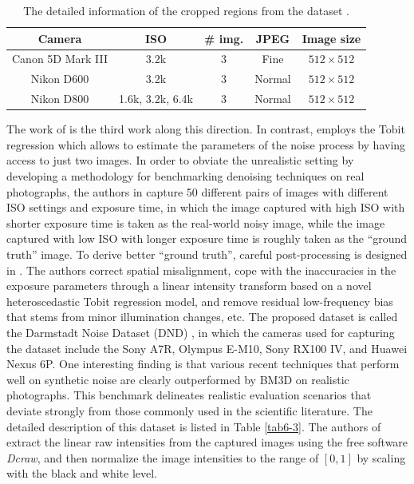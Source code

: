 \begin{table}[ht!]
\caption{The detailed information of the cropped regions from the dataset \cite{crosschannel2016}.}
\vspace{-5mm}
\label{tab6-2}
\begin{center}
\small
\renewcommand\arraystretch{1.2}
\begin{tabular*}{1\textwidth}{@{\extracolsep{\fill}}ccccc}
\hline
Camera
& 
ISO
&
\# img.
&
JPEG
&
Image size
\\
\hline
Canon 5D Mark III & 3.2k  & 3  & Fine & $512\times512$
\\
\hline
Nikon D600 & 3.2k & 3  & Normal & $512\times512$
\\
\hline   
Nikon D800 & 1.6k, 3.2k, 6.4k & 3  & Normal & $512\times512$
\\
\hline
\end{tabular*}
\end{center}
\end{table}

The work of \cite{dnd2017} is the third work along this direction. In contrast, \cite{dnd2017} employs the Tobit regression which allows to estimate the parameters of the noise process by having access to just two images. In order to obviate the unrealistic setting by developing a methodology for benchmarking denoising techniques on real photographs, the authors in \cite{dnd2017} capture 50 different pairs of images with different ISO settings and exposure time, in which the image captured with high ISO with shorter exposure time is taken as the real-world noisy image, while the image captured with low ISO with longer exposure time is roughly taken as the ``ground truth'' image. To derive better ``ground truth'', careful post-processing is designed in \cite{dnd2017}. The authors correct spatial misalignment, cope with the inaccuracies in the exposure parameters through a linear intensity transform based on a novel heteroscedastic Tobit regression model, and remove residual low-frequency bias that stems from minor illumination changes, etc. The proposed dataset is called the Darmstadt Noise Dataset (DND) \cite{dnd2017}, in which the cameras used for capturing the dataset include the Sony A7R, Olympus E-M10, Sony RX100 IV, and Huawei Nexus 6P. One interesting finding is that various recent techniques that perform well on synthetic noise are clearly outperformed by BM3D \cite{bm3d} on realistic photographs. This benchmark delineates realistic evaluation scenarios that deviate strongly from those commonly used in the scientific literature. The detailed description of this dataset is listed in Table \ref{tab6-3}. The authors of \cite{dnd2017} extract the linear raw intensities from the captured images using the free software \textsl{Dcraw}, and then normalize the image intensities to the range of $[0, 1]$ by scaling with the black and white level.

